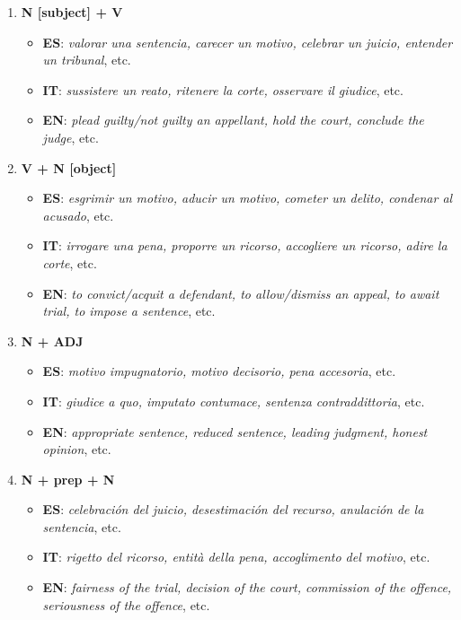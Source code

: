 \documentclass[output=paper]{LSP/langsci}
\begin{document}
\begin{enumerate}
\item\textbf{ N [subject] + V}
\begin{itemize}
\item \textbf{ES}: \textit{valorar una sentencia, carecer un motivo, celebrar un juicio, entender un tribunal}, etc.
\item \textbf{IT}: \textit{sussistere un reato, ritenere la corte, osservare il giudice}, etc.
\item \textbf{EN}: \textit{plead guilty/not guilty an appellant, hold the court, conclude the judge}, etc.
\end{itemize}
\item \textbf{V + N [object]}
\begin{itemize}
\item \textbf{ES}: \textit{esgrimir un motivo, aducir un motivo, cometer un delito, condenar al acusado}, etc.
\item \textbf{IT}: \textit{irrogare una pena, proporre un ricorso, accogliere un ricorso, adire la corte}, etc.
\item \textbf{EN}: \textit{to convict/acquit a defendant, to allow/dismiss an appeal, to await trial, to impose a sentence}, etc.
\end{itemize}
\item \textbf{N + ADJ}
\begin{itemize}
\item \textbf{ES}: \textit{motivo impugnatorio, motivo decisorio, pena accesoria}, etc.
\item \textbf{IT}: \textit{giudice a quo, imputato contumace, sentenza contraddittoria}, etc.
\item \textbf{EN}: \textit{appropriate sentence, reduced sentence, leading judgment, honest opinion}, etc.
\end{itemize}
\item \textbf{N + prep + N}
\begin{itemize}
\item \textbf{ES}: \textit{celebración del juicio, desestimación del recurso, anulación de la sentencia}, etc.
\item \textbf{IT}: \textit{rigetto del ricorso, entità della pena, accoglimento del motivo}, etc.
\item \textbf{EN}: \textit{fairness of the trial, decision of the court, commission of the offence, seriousness of the offence}, etc.
\end{itemize}
\end{enumerate}
\end{document}
